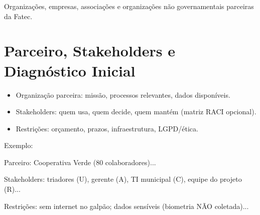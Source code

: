 Organizações, empresas, associações e organizações não governamentais parceiras da Fatec.

\section{Parceiro, Stakeholders e Diagnóstico Inicial}

\begin{itemize}
    \item Organização parceira: missão, processos relevantes, dados disponíveis.
    \item Stakeholders: quem usa, quem decide, quem mantém (matriz RACI opcional).
    \item Restrições: orçamento, prazos, infraestrutura, LGPD/ética.
\end{itemize}

Exemplo:

Parceiro: Cooperativa Verde (80 colaboradores)...

Stakeholders: triadores (U), gerente (A), TI municipal (C), equipe do projeto (R)...

Restrições: sem internet no galpão; dados sensíveis (biometria NÃO coletada)...

